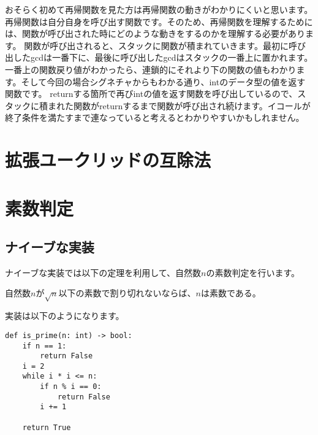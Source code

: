 \documentclass{jlreq}
\begin{document}
\begin{tcolorbox}[enhanced, title=コラム 再帰関数, breakable, colback=white, drop fuzzy shadow, attach boxed title to top center={yshift*=0.1cm}]
  おそらく初めて再帰関数を見た方は再帰関数の動きがわかりにくいと思います。再帰関数は自分自身を呼び出す関数です。そのため、再帰関数を理解するためには、関数が呼び出された時にどのような動きをするのかを理解する必要があります。
  関数が呼び出されると、スタックに関数が積まれていきます。最初に呼び出したgcdは一番下に、最後に呼び出したgcdはスタックの一番上に置かれます。一番上の関数戻り値がわかったら、連鎖的にそれより下の関数の値もわかります。そして今回の場合シグネチャからもわかる通り、intのデータ型の値を返す関数です。
  returnする箇所で再びintの値を返す関数を呼び出しているので、スタックに積まれた関数がreturnするまで関数が呼び出され続けます。イコールが
  終了条件を満たすまで連なっていると考えるとわかりやすいかもしれません。
\end{tcolorbox}

\section{拡張ユークリッドの互除法}

\section{素数判定}

\subsection{ナイーブな実装}

ナイーブな実装では以下の定理を利用して、自然数$n$の素数判定を行います。

\begin{tcolorbox}[enhanced,title=定理1, 
  attach boxed title to top left, 
  colback=white!95!blue,
  colbacktitle=white!10!blue!50!black,
  drop fuzzy shadow,
  boxrule=0.25mm,
  ]
  自然数$n$が$\sqrt{n}$以下の素数で割り切れないならば、$n$は素数である。
\end{tcolorbox}
実装は以下のようになります。

\begin{lstlisting}[caption=ナイーブな素数判定, frame=TRBL, label={naivePriem}]
def is_prime(n: int) -> bool:
    if n == 1:
        return False
    i = 2
    while i * i <= n:
        if n % i == 0:
            return False
        i += 1
    
    return True

\end{lstlisting}
\end{document}
